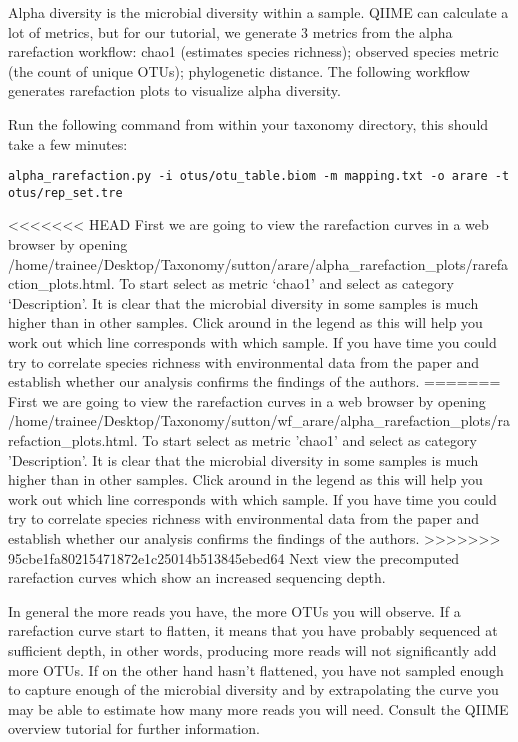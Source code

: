 Alpha diversity is the microbial diversity within a sample. QIIME can calculate a lot of metrics, but for our tutorial, we generate 3 metrics from the alpha rarefaction workflow: chao1 (estimates species richness); observed species metric (the count of unique OTUs); phylogenetic distance. The following workflow generates rarefaction plots to visualize alpha diversity.

\begin{steps}
Run the following command from within your taxonomy directory, this should take a few minutes:
\begin{lstlisting}
alpha_rarefaction.py -i otus/otu_table.biom -m mapping.txt -o arare -t otus/rep_set.tre
\end{lstlisting}
\end{steps}

<<<<<<< HEAD
First we are going to view the rarefaction curves in a web browser by opening /home/trainee/Desktop/Taxonomy/sutton/arare/alpha\_rarefaction\_plots/rarefaction\_plots.html. 
To start select as metric ‘chao1’ and select as category ‘Description’. It is clear that the microbial diversity in some samples is much higher than in other samples. Click around in the legend as this will help you work out which line corresponds with which sample. If you have time you could try to correlate species richness with environmental data from the paper and establish whether our analysis confirms the findings of the authors.
=======
First we are going to view the rarefaction curves in a web browser by opening /home/trainee/Desktop/Taxonomy/sutton/wf\_arare/alpha\_rarefaction\_plots/rarefaction\_plots.html. 
To start select as metric 'chao1' and select as category 'Description'. It is clear that the microbial diversity in some samples is much higher than in other samples. Click around in the legend as this will help you work out which line corresponds with which sample. If you have time you could try to correlate species richness with environmental data from the paper and establish whether our analysis confirms the findings of the authors.
>>>>>>> 95cbe1fa80215471872e1c25014b513845ebed64
Next view the precomputed rarefaction curves which show an increased sequencing depth.

In general the more reads you have, the more OTUs you will observe. If a rarefaction curve start to flatten, it means that you have probably sequenced at sufficient depth, in other words, producing more reads will not significantly add more OTUs. If on the other hand hasn't flattened, you have not sampled enough to capture enough of the microbial diversity and by extrapolating the curve you may be able to estimate how many more reads you will need. Consult the QIIME overview tutorial for further information.

